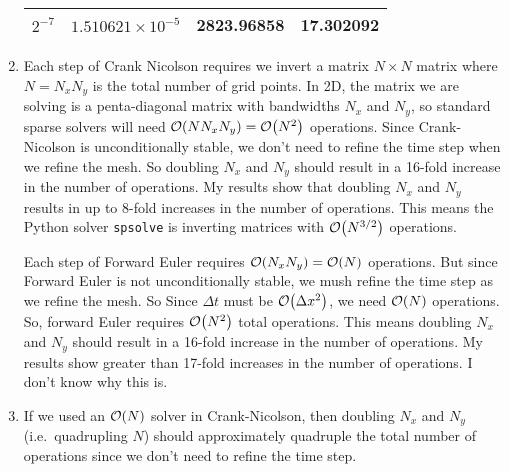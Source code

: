 \documentclass{article} %
\theoremstyle{plain}
\newcommand{\Dx}{\Delta x}
\newcommand{\Dt}{\Delta t}
\numberwithin{equation}{section} %
\numberwithin{figure}{section} %
\numberwithin{table}{section} %
\begin{document}
\begin{enumerate}[\ \ (a)]
\begin{table}[ht!]
\begin{tabular}{||l|l|l|l||}
                $2^{-7}$ & $1.510621\times10^{-5}$ & 2823.96858 & 17.302092 \\\hline\hline
            \end{tabular}
        \end{table}
    \item
        Each step of Crank Nicolson requires we invert a matrix $N\times N$ matrix where $N = N_xN_y$ is the total number of grid points.  In 2D, the matrix we are solving is a penta-diagonal matrix with bandwidths $N_x$ and $N_y$, so standard sparse solvers will need $\order{NN_xN_y} = \order{N^2}$ operations.  Since Crank-Nicolson is unconditionally stable, we don't need to refine the time step when we refine the mesh.  So doubling $N_x$ and $N_y$ should result in a 16-fold increase in the number of operations.  My results show that doubling $N_x$ and $N_y$ results in up to 8-fold increases in the number of operations.  This means the Python solver \verb|spsolve| is inverting matrices with $\order{N^{3/2}}$ operations.

        Each step of Forward Euler requires $\order{N_xN_y} = \order{N}$ operations.  But since Forward Euler is not unconditionally stable, we mush refine the time step as we refine the mesh.  So Since $\Dt$ must be $\order{\Dx^2}$, we need $\order{N}$ operations.  So, forward Euler requires $\order{N^2}$ total operations.  This means doubling $N_x$ and $N_y$ should result in a 16-fold increase in the number of operations.  My results show greater than 17-fold increases in the number of operations.  I don't know why this is.
    \item
        If we used an $\order{N}$ solver in Crank-Nicolson, then doubling $N_x$ and $N_y$ (i.e.~quadrupling $N$) should approximately quadruple the total number of operations since we don't need to refine the time step.
\end{enumerate}
\end{document}
